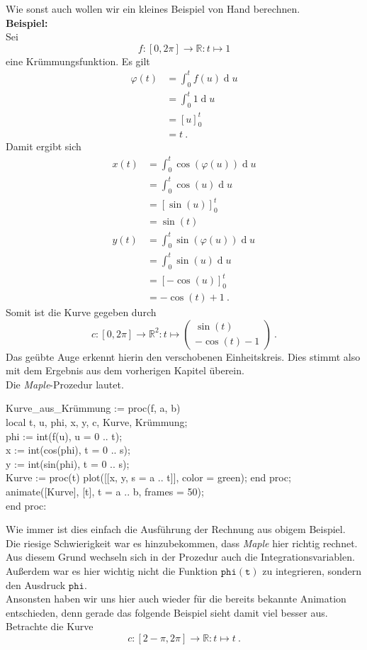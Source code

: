 \documentclass[12pt]{article}
\renewcommand{\d}{\operatorname{d}}
\newenvironment{Code}{\begin{mdframed}[topline=false,bottomline=false,linewidth=1pt]\begin{scriptsize}\begin{tt}}
{\end{tt}\end{scriptsize}\end{mdframed}}
\begin{document}
Wie sonst auch wollen wir ein kleines Beispiel von Hand berechnen.\\
\textbf{Beispiel:}\\
Sei
\[f:[0,2\pi] \rightarrow \mathbb{R}: t \mapsto 1\]
eine Krümmungsfunktion. Es gilt
\begin{align*}
\varphi(t) &= \int_0^t f(u) \d u\\
&= \int_0^t 1 \d u\\
&= \left[ u \right]_0^t\\
&= t~.
\end{align*}
Damit ergibt sich
\begin{align*}
x(t) &= \int_0^t \cos(\varphi(u)) \d u\\
&= \int_0^t \cos(u) \d u\\
&= \left[ \sin(u) \right]_0^t\\
&= \sin(t)\\
y(t) &= \int_0^t \sin(\varphi(u)) \d u\\
&= \int_0^t \sin(u) \d u\\
&= \left[ -\cos(u) \right]_0^t\\
&= -\cos(t) + 1~.
\end{align*}
Somit ist die Kurve gegeben durch
\[c: [0,2\pi] \rightarrow \mathbb{R}^2: t \mapsto \begin{pmatrix}
\sin(t) \\ -\cos(t) -1\end{pmatrix}~.\]
Das geübte Auge erkennt hierin den verschobenen Einheitskreis. Dies stimmt also mit dem Ergebnis aus dem vorherigen Kapitel überein.\\

Die \textit{Maple}-Prozedur lautet.
\begin{Code}
Kurve\_aus\_Krümmung := proc(f, a, b)\\
local t, u, phi, x, y, c, Kurve, Krümmung;\\
phi := int(f(u), u = 0 .. t);\\
x := int(cos(phi), t = 0 .. s);\\
y := int(sin(phi), t = 0 .. s);\\
Kurve := proc(t) plot([[x, y, s = a .. t]], color = green); end proc;\\
animate([Kurve], [t], t = a .. b, frames = 50);\\
end proc:
\end{Code}

Wie immer ist dies einfach die Ausführung der Rechnung aus obigem Beispiel.\\
Die riesige Schwierigkeit war es hinzubekommen, dass \textit{Maple} hier richtig rechnet. Aus diesem Grund wechseln sich in der Prozedur auch die Integrationsvariablen. Außerdem war es hier wichtig nicht die Funktion $\mathtt{phi(t)}$ zu integrieren, sondern den Ausdruck $\mathtt{phi}$.\\
Ansonsten haben wir uns hier auch wieder für die bereits bekannte Animation entschieden, denn gerade das folgende Beispiel sieht damit viel besser aus.\\
Betrachte die Kurve
\[c: [2-\pi,2\pi] \rightarrow \mathbb{R}: t \mapsto t~.\]
\end{document}
